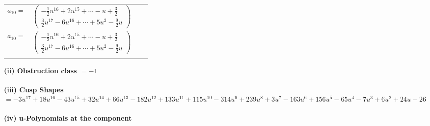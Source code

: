 \documentclass[1p]{elsarticle_modified}
\theoremstyle{definition}
\begin{document}
\begin{tabular}{m{7pt} m{180pt} m{7pt} m{180pt} }
\flushright $a_{10}=$&$\begin{pmatrix}-\frac{1}{2} u^{16}+2 u^{15}+\cdots- u+\frac{3}{2}\\\frac{3}{2} u^{17}-6 u^{16}+\cdots+5 u^2-\frac{9}{2} u\end{pmatrix}$\\ \flushright $a_{10}=$&$\begin{pmatrix}-\frac{1}{2} u^{16}+2 u^{15}+\cdots- u+\frac{3}{2}\\\frac{3}{2} u^{17}-6 u^{16}+\cdots+5 u^2-\frac{9}{2} u\end{pmatrix}$\\&\end{tabular}
\flushleft \textbf{(ii) Obstruction class $= -1$}\\~\\
\flushleft \textbf{(iii) Cusp Shapes $= -3 u^{17}+18 u^{16}-43 u^{15}+32 u^{14}+66 u^{13}-182 u^{12}+133 u^{11}+115 u^{10}-314 u^9+239 u^8+3 u^7-163 u^6+156 u^5-65 u^4-7 u^3+6 u^2+24 u-26$}\\~\\
\newpage\renewcommand{\arraystretch}{1}
\flushleft \textbf{(iv) u-Polynomials at the component}\newline \\
\end{document}
